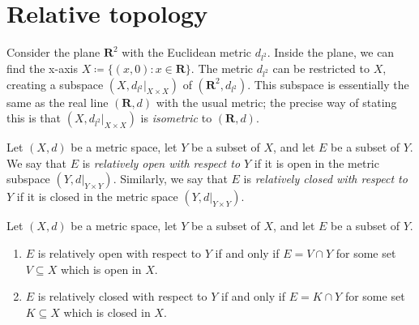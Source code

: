 \section{Relative topology}\label{sec 1.3}

\begin{note}
    Consider the plane \(\mathbf{R}^2\) with the Euclidean metric \(d_{l^2}\).
    Inside the plane, we can ﬁnd the x-axis \(X \coloneqq \{(x, 0) : x \in \mathbf{R}\}\).
    The metric \(d_{l^2}\) can be restricted to \(X\), creating a subspace \((X, d_{l^2}|_{X \times X})\) of \((\mathbf{R}^2, d_{l^2})\).
    This subspace is essentially the same as the real line \((\mathbf{R}, d)\) with the usual metric;
    the precise way of stating this is that \((X, d_{l^2}|_{X \times X})\) is \emph{isometric} to \((\mathbf{R}, d)\).
\end{note}

\setcounter{theorem}{2}
\begin{definition}\label{1.3.3}
    Let \((X, d)\) be a metric space, let \(Y\) be a subset of \(X\), and let \(E\) be a subset of \(Y\).
    We say that \(E\) is \emph{relatively open with respect to \(Y\)} if it is open in the metric subspace \((Y, d|_{Y \times Y})\).
    Similarly, we say that \(E\) is \emph{relatively closed with respect to \(Y\)} if it is closed in the metric space \((Y, d|_{Y \times Y})\).
\end{definition}

\begin{proposition}\label{1.3.4}
    Let \((X, d)\) be a metric space, let \(Y\) be a subset of \(X\), and let \(E\) be a subset of \(Y\).
    \begin{enumerate}
        \item \(E\) is relatively open with respect to \(Y\) if and only if \(E = V \cap Y\) for some set \(V \subseteq X\) which is open in \(X\).
        \item \(E\) is relatively closed with respect to \(Y\) if and only if \(E = K \cap Y\) for some set \(K \subseteq X\) which is closed in \(X\).
    \end{enumerate}
\end{proposition}

